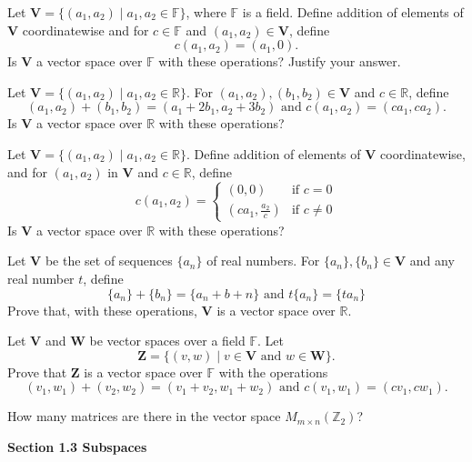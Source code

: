 \documentclass[11pt,largemargins]{homework}
\begin{document}
\question
Let $\mathbf{V}=\{(a_1,a_2) \;|\; a_1,a_2 \in \mathbb{F}\}$, where $\mathbb{F}$ is a field. 
Define addition of elements of \textbf{V} coordinatewise 
and for $c \in \mathbb{F}$ and $(a_1,a_2)\in \mathbf{V}$, define 
$$c(a_1,a_2)=(a_1,0).$$
Is \textbf{V} a vector space over $\mathbb{F}$ with these operations? Justify your answer.

\question
Let $\mathbf{V}=\{(a_1,a_2) \;|\; a_1,a_2 \in \mathbb{R}\}$. For $(a_1,a_2),(b_1,b_2) \in \mathbf{V}$ and $c\in \mathbb{R}$,
define 
$$(a_1,a_2)+(b_1,b_2)=(a_1+2b_1,a_2+3b_2)\text{ and }c(a_1,a_2)=(ca_1,ca_2).$$
Is \textbf{V} a vector space over $\mathbb{R}$ with these operations?

\question
Let $\mathbf{V}=\{(a_1,a_2) \;|\; a_1,a_2 \in \mathbb{R}\}$. Define addition of elements of \textbf{V} coordinatewise, 
and for $(a_1,a_2)$ in \textbf{V} and $c \in \mathbb{R}$, define
\[ 
    c(a_1,a_2)=
\begin{cases}
    (0,0)    & \text{if }c=0\\
    \left(ca_1,\frac{a_2}{c}\right) & \text{if }c\neq 0
\end{cases}
\]
Is \textbf{V} a vector space over $\mathbb{R}$ with these operations?

\question
Let \textbf{V} be the set of sequences $\{a_n\}$ of real numbers. For $\{a_n\},\{b_n\}\in \mathbf{V}$ and any real number $t$, define
$$\{a_n\}+\{b_n\}=\{a_n+b+n\}\text{ and }t\{a_n\}=\{ta_n\}$$
Prove that, with these operations, \textbf{V} is a vector space over $\mathbb{R}$.

\question
Let \textbf{V} and \textbf{W} be vector spaces over a field $\mathbb{F}$. Let 
$$\mathbf{Z}=\{(v,w) \;|\; v\in \mathbf{V}\text{ and }w\in\mathbf{W} \}.$$
Prove that \textbf{Z} is a vector space over $\mathbb{F}$ with the operations 
$$(v_1,w_1)+(v_2,w_2)=(v_1+v_2,w_1+w_2)\text{ and }c(v_1,w_1)=(cv_1,cw_1).$$

\question
How many matrices are there in the vector space $M_{m\times n}(\mathbb{Z}_2)$?



\hfill

\textbf{\large{Section 1.3} Subspaces}
\setcounter{questionCounter}{0}
\question

\question

\question

\question
\end{document}
